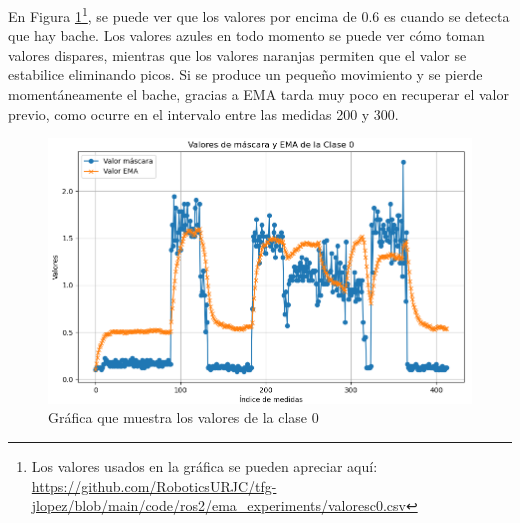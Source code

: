 
En Figura \ref{fig:diagramaemac0}\footnote{Los valores usados en la gráfica se pueden apreciar aquí: \url{https://github.com/RoboticsURJC/tfg-jlopez/blob/main/code/ros2/ema_experiments/valoresc0.csv}}, se puede ver que los valores por encima de 0.6 es cuando se detecta que hay bache. Los valores azules en todo momento se puede ver cómo toman valores dispares, mientras que los valores naranjas permiten que el valor se estabilice eliminando picos. Si se produce un pequeño movimiento y se pierde momentáneamente el bache, gracias a EMA tarda muy poco en recuperar el valor previo, como ocurre en el intervalo entre las medidas 200 y 300.

\begin{figure} [h!]
	\begin{center}
		\includegraphics[width=11.5cm]{figs/cap7/GraficaC0.png}
	\end{center}
	\caption{Gráfica que muestra los valores de la clase 0}
	\label{fig:diagramaemac0}
\end{figure}


